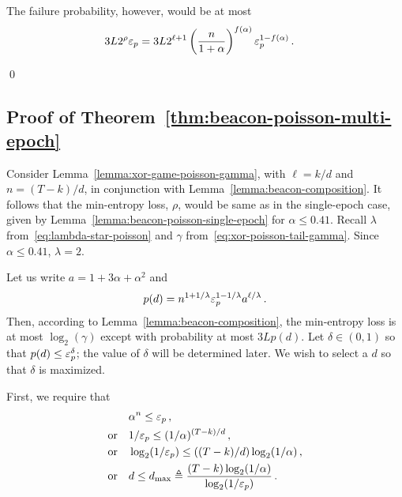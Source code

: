   The failure probability, however, would be at most
  \begin{align*}
    3 L 2^\rho \mathsf{\varepsilon}_p
    &= 3 L 2^{\ell + 1} 
      \left(\frac{n}{1+\alpha}\right)^{f(\alpha)} 
      \mathsf{\varepsilon}_p^{1 - f(\alpha)}
      \,.
  \end{align*}
  
\hfill\qed


\subsection*{Proof of Theorem~\ref{thm:beacon-poisson-multi-epoch}}
  Consider Lemma~\ref{lemma:xor-game-poisson-gamma}, 
  with $\ell = k/d$ and $n = (T-k)/d$, 
  in conjunction with Lemma~\ref{lemma:beacon-composition}.
  It follows that the min-entropy loss, $\rho$, 
  would be same as in the single-epoch case, 
  given by Lemma~\ref{lemma:beacon-poisson-single-epoch} 
  for $\alpha \leq 0.41$. 
  Recall $\lambda$ from~\eqref{eq:lambda-star-poisson} and $\gamma$ from~\eqref{eq:xor-poisson-tail-gamma}.
  Since $\alpha \leq 0.41$, $\lambda = 2$.
  
  Let us write $a = 1 + 3 \alpha + \alpha^2$ 
  and 
  $$
    p(d) = n^{1+1/\lambda} \mathsf{\varepsilon}_p^{1 - 1/\lambda} a^{\ell/\lambda}
    \,.
  $$
  Then, according to Lemma~\ref{lemma:beacon-composition}, 
  the min-entropy loss is at most $\log_2(\gamma)$ 
  except with probability at most $3 L p(d)$. 
  Let $\delta \in (0, 1)$ so that $p(d) \leq \mathsf{\varepsilon}_p^\delta$; 
  the value of $\delta$ will be determined later. 
  We wish to select a $d$ so that $\delta$ is maximized.

  First, we require that 
  \begin{align*}
    &\alpha^n \leq \mathsf{\varepsilon}_p\,,\\
    \text{or}\quad &
      1/\mathsf{\varepsilon}_p \leq (1/\alpha)^{(T - k)/d}\,,\\
    \text{or}\quad &
      \log_2(1/\mathsf{\varepsilon}_p) \leq ((T - k)/d)\log_2(1/\alpha)\,,\\
    \text{or}\quad &
      d \leq d_\mathrm{max} \triangleq \frac{(T - k)\log_2(1/\alpha)}{\log_2(1/\mathsf{\varepsilon}_p)}
      \,.
  \end{align*}

